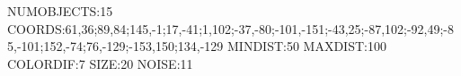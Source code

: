 NUMOBJECTS:15
COORDS:61,36;89,84;145,-1;17,-41;1,102;-37,-80;-101,-151;-43,25;-87,102;-92,49;-85,-101;152,-74;76,-129;-153,150;134,-129
MINDIST:50
MAXDIST:100
COLORDIF:7
SIZE:20
NOISE:11
